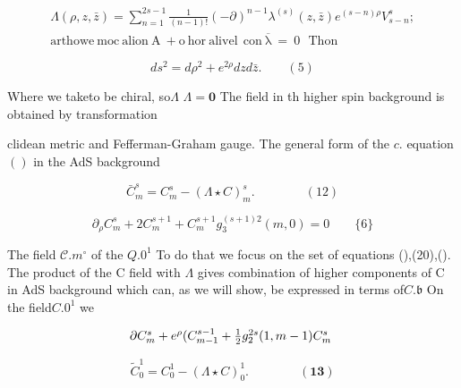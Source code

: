 \documentclass{article}
\begin{document}
\begin{equation}
\begin{array} { r } { \Lambda ( \rho, z, \bar { z } ) = \sum _ { n = 1 } ^ { 2 s - 1 } \frac { 1 } { ( n - 1 )! } ( - \partial ) ^ { n - 1 } \lambda ^ { ( s ) } ( z, \bar { z } ) e ^ { ( s - n ) \rho } V _ { s - n } ^ { s } ; } \\ { \mathrm { a r t h o w e ~ m o c ~ a l i o n ~ A ~ + o ~ h o r ~ a l i v e l ~ ~ c o n ~ \overline { \lambda } ~ = ~ 0 ~ ~ ~ T h o n}}\end{array}
\end{equation}


\begin{equation}
d s ^ { 2 } = d \rho ^ { 2 } + e ^ { 2 \rho } d z d \bar { z }. \qquad ( 5 )
\end{equation}


Where we taketo be chiral, so$\Lambda$ $\Lambda = \mathbf { 0 }$ The field in th
higher spin background is obtained by transformation


clidean metric and Fefferman-Graham gauge. The general form of the $c.$ equation $( )$ in the AdS background


\begin{equation}
\bar { C } _ { m } ^ { s } = C _ { m } ^ { s } - ( \Lambda \star C ) _ { m } ^ { s }. \qquad \qquad ( 1 2 )
\end{equation}


\begin{equation}
\partial _ { \rho } C _ { m } ^ { s } + 2 C _ { m } ^ { s + 1 } + C _ { m } ^ { s + 1 } g _ { 3 } ^ { ( s + 1 ) 2 } ( m, 0 ) = 0 \qquad \{ 6 \}
\end{equation}


The field $\mathcal { C } . { m } ^ { \circ }$  of the $Q . { 0 } ^ { 1 }$ To do that
we focus on the set of equations (),(20),(). The product
of the C field with $\Lambda$ gives combination of higher components of C in AdS background which can, as we will
show, be expressed in terms of$C . { \mathfrak { b } }$ On the field$C . { 0 } ^ { 1 }$ we


\begin{equation}
\begin{array} { c c } { \partial C _ { m } ^ { s } + e ^ { \rho } ( C _ { m - 1 } ^ { s - 1 } + \frac { 1 } { 2 } g _ { 2 } ^ { 2 s } ( 1, m - 1 ) C _ { m } ^ { s } ~ }\end{array}
\end{equation}


\begin{equation}
\tilde { C } _ { 0 } ^ { 1 } = C _ { 0 } ^ { 1 } - ( \Lambda \star C ) _ { 0 } ^ { 1 }. \qquad \qquad ( \mathbf { 1 3 } )
\end{equation}
\end{document}
